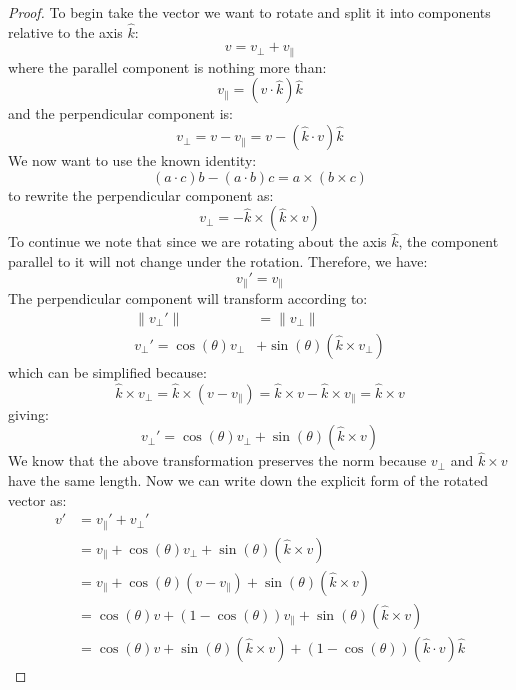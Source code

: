 \documentclass[12pt, letterpaper, onecolumn, conference, final]{IEEEtran}
\theoremstyle{definition}
\theoremstyle{plain}
\begin{document}
\begin{proof}
To begin take the vector we want to rotate and split it into components relative to the axis $\hat{k}$:
\begin{equation*}
v = v_\perp + v_\parallel
\end{equation*}
where the parallel component is nothing more than:
\begin{equation*}
v_\parallel = (v \cdot \hat{k})\hat{k}
\end{equation*}
and the perpendicular component is:
\begin{equation*}
v_\perp = v - v_\parallel = v - (\hat{k} \cdot v)\hat{k}
\end{equation*}
We now want to use the known identity:
\begin{equation*}
(a \cdot c)b - (a \cdot b)c = a \times (b \times c)
\end{equation*}
to rewrite the perpendicular component as:
\begin{equation*}
v_\perp = -\hat{k} \times (\hat{k} \times v)
\end{equation*}
To continue we note that since we are rotating about the axis $\hat{k}$, the component parallel to it will not change under the rotation. Therefore, we have:
\begin{equation*}
v_\parallel' = v_\parallel
\end{equation*}
The perpendicular component will transform according to:
\begin{equation*}
\begin{split}
\| v_\perp' \| &= \| v_\perp \| \\
v_\perp' = \cos(\theta)v_\perp &+ \sin(\theta)(\hat{k} \times v_\perp)
\end{split}
\end{equation*}
which can be simplified because:
\begin{equation*}
\hat{k} \times v_\perp = \hat{k} \times (v - v_\parallel) = \hat{k} \times v - \hat{k} \times v_\parallel = \hat{k} \times v
\end{equation*}
giving:
\begin{equation*}
v_\perp' = \cos(\theta)v_\perp + \sin(\theta)(\hat{k} \times v)
\end{equation*}
We know that the above transformation preserves the norm because $v_\perp$ and $\hat{k} \times v$ have the same length. Now we can write down the explicit form of the rotated vector as:
\begin{equation*}
\begin{split}
v' &=  v_\parallel' + v_\perp' \\
&= v_\parallel + \cos(\theta)v_\perp + \sin(\theta)(\hat{k} \times v) \\
&= v_\parallel + \cos(\theta)(v - v_\parallel) + \sin(\theta)(\hat{k} \times v) \\
&= \cos(\theta)v + (1 - \cos(\theta))v_\parallel + \sin(\theta)(\hat{k} \times v) \\
&= \cos(\theta)v + \sin(\theta)(\hat{k} \times v) + (1 - \cos(\theta))(\hat{k} \cdot v)\hat{k}
\end{split}
\end{equation*}
\end{proof}
\end{document}
